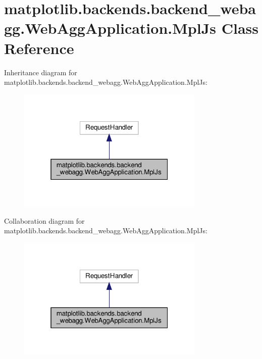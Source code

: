\hypertarget{classmatplotlib_1_1backends_1_1backend__webagg_1_1WebAggApplication_1_1MplJs}{}\section{matplotlib.\+backends.\+backend\+\_\+webagg.\+Web\+Agg\+Application.\+Mpl\+Js Class Reference}
\label{classmatplotlib_1_1backends_1_1backend__webagg_1_1WebAggApplication_1_1MplJs}


Inheritance diagram for matplotlib.\+backends.\+backend\+\_\+webagg.\+Web\+Agg\+Application.\+Mpl\+Js\+:
\nopagebreak
\begin{figure}[H]
\begin{center}
\leavevmode
\includegraphics[width=253pt]{classmatplotlib_1_1backends_1_1backend__webagg_1_1WebAggApplication_1_1MplJs__inherit__graph}
\end{center}
\end{figure}


Collaboration diagram for matplotlib.\+backends.\+backend\+\_\+webagg.\+Web\+Agg\+Application.\+Mpl\+Js\+:
\nopagebreak
\begin{figure}[H]
\begin{center}
\leavevmode
\includegraphics[width=253pt]{classmatplotlib_1_1backends_1_1backend__webagg_1_1WebAggApplication_1_1MplJs__coll__graph}
\end{center}
\end{figure}
